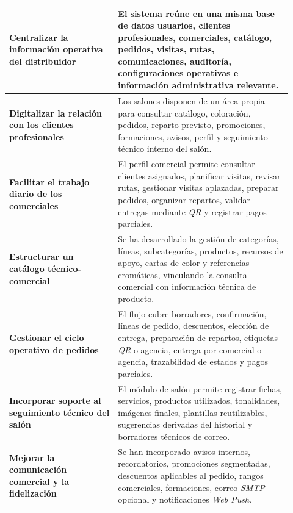 {\footnotesize
\setlength{\parskip}{0pt}
\setlength{\tabcolsep}{4pt}
\renewcommand{\arraystretch}{1.14}
\begin{supertabular}{|>{\raggedright\arraybackslash}p{0.35\linewidth}|>{\raggedright\arraybackslash}p{0.57\linewidth}|}
\textbf{Centralizar la información operativa del distribuidor} & El sistema reúne en una misma base de datos usuarios, clientes profesionales, comerciales, catálogo, pedidos, visitas, rutas, comunicaciones, auditoría, configuraciones operativas e información administrativa relevante.\\
\hline
\textbf{Digitalizar la relación con los clientes profesionales} & Los salones disponen de un área propia para consultar catálogo, coloración, pedidos, reparto previsto, promociones, formaciones, avisos, perfil y seguimiento técnico interno del salón.\\
\hline
\textbf{Facilitar el trabajo diario de los comerciales} & El perfil comercial permite consultar clientes asignados, planificar visitas, revisar rutas, gestionar visitas aplazadas, preparar pedidos, organizar repartos, validar entregas mediante \textit{QR} y registrar pagos parciales.\\
\hline
\textbf{Estructurar un catálogo técnico-comercial} & Se ha desarrollado la gestión de categorías, líneas, subcategorías, productos, recursos de apoyo, cartas de color y referencias cromáticas, vinculando la consulta comercial con información técnica de producto.\\
\hline
\textbf{Gestionar el ciclo operativo de pedidos} & El flujo cubre borradores, confirmación, líneas de pedido, descuentos, elección de entrega, preparación de repartos, etiquetas \textit{QR} o agencia, entrega por comercial o agencia, trazabilidad de estados y pagos parciales.\\
\hline
\textbf{Incorporar soporte al seguimiento técnico del salón} & El módulo de salón permite registrar fichas, servicios, productos utilizados, tonalidades, imágenes finales, plantillas reutilizables, sugerencias derivadas del historial y borradores técnicos de correo.\\
\hline
\textbf{Mejorar la comunicación comercial y la fidelización} & Se han incorporado avisos internos, recordatorios, promociones segmentadas, descuentos aplicables al pedido, rangos comerciales, formaciones, correo \textit{SMTP} opcional y notificaciones \textit{Web Push}.\\

\end{supertabular}}
